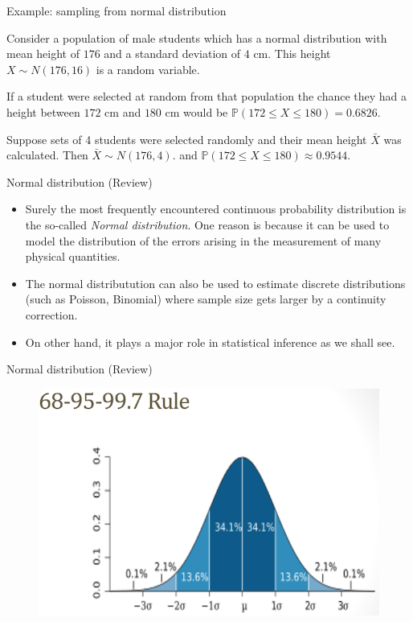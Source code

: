 \documentclass[ignorenonframetext,]{beamer}
\begin{document}
\begin{frame}{Example: sampling from normal distribution}

Consider a population of male students which has a normal distribution
with mean height of \(176\) and a standard deviation of \(4\) cm. This
height \(X\sim N(176,16)\) is a random variable.

If a student were selected at random from that population the chance
they had a height between \(172\) cm and \(180\) cm would be
\(\mathbb{P}(172\le X\le 180)=0.6826\).

Suppose sets of 4 students were selected randomly and their mean height
\(\bar{X}\) was calculated. Then \(\bar{X}\sim N(176,4).\) and
\(\mathbb{P}(172\le X\le 180)\approx 0.9544\).

\end{frame}

\begin{frame}{Normal distribution (Review)}

\begin{itemize}
\item
  Surely the most frequently encountered continuous probability
  distribution is the so-called \emph{Normal distribution}. One reason
  is because it can be used to model the distribution of the errors
  arising in the measurement of many physical quantities.
\item
  The normal distributution can also be used to estimate discrete
  distributions (such as Poisson, Binomial) where sample size gets
  larger by a continuity correction.
\item
  On other hand, it plays a major role in statistical inference as we
  shall see.
\end{itemize}

\end{frame}

\begin{frame}{Normal distribution (Review)}

\begin{figure}
\centering
\includegraphics{68-95-99.png}
\caption{}
\end{figure}

\end{frame}
\end{document}
